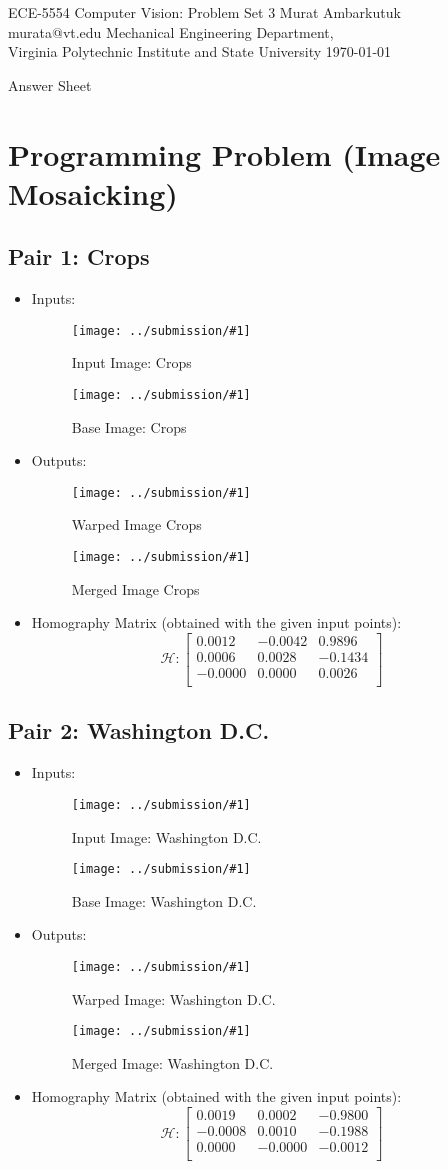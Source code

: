 \documentclass{article}
\newcommand{\listFigure}[3]{ \begin{figure}[H]
\texttt{[image: ../submission/\#1]}
		\caption{#2\label{fig:#3}}
	\end{figure}		
}
\begin{document}
\label{Cover}
	\begin{center}
	\large{ECE-5554 Computer Vision: Problem Set 3} 
	\vfill
	Murat Ambarkutuk \\ murata@vt.edu
	\vfill
	Mechanical Engineering Department,\\ Virginia Polytechnic Institute and State University
	\vfill
	\today
	\end{center}
\pagebreak 
\large{Answer Sheet}

\label{Programming Problem (Image Mosaicking)}
\section{Programming Problem (Image Mosaicking)}
\subsection{Pair 1: Crops}
\begin{itemize}
	\item Inputs:
	\listFigure{input-k-1.png}{Input Image: Crops}{cropsinput-1}
	\listFigure{base-k-1.png}{Base Image: Crops}{cropsinput-2}
	\item Outputs:
	\listFigure{warpIm-k-1.png}{Warped Image Crops}{cropswarp}
	\listFigure{mergeIm-k-1.png}{Merged Image Crops}{cropsmerge}
	\item Homography Matrix (obtained with the given input points):
	$$ \mathcal{H}: \begin{bmatrix}
    0.0012  & -0.0042 &  0.9896 \\
    0.0006  &  0.0028 & -0.1434 \\
   -0.0000  &  0.0000 &  0.0026 \\
	\end{bmatrix}$$
\end{itemize}
\subsection{Pair 2: Washington D.C.}
\begin{itemize}
\item Inputs:
	\listFigure{input-k-2.png}{Input Image: Washington D.C.}{wdcinput-1}
	\listFigure{base-k-2.png}{Base Image: Washington D.C.}{wdcinput-2}
	\item Outputs:
	\listFigure{warpIm-k-2.png}{Warped Image: Washington D.C.}{wdcwarp}
	\listFigure{mergeIm-k-2.png}{Merged Image: Washington D.C.}{wdcmerge}
	\item Homography Matrix (obtained with the given input points):
	$$ \mathcal{H}: \begin{bmatrix}
	0.0019 &  0.0002 & -0.9800 \\
   -0.0008 &  0.0010 & -0.1988 \\
    0.0000 & -0.0000 & -0.0012 \\
	\end{bmatrix}$$
\end{itemize} 
\end{document}
